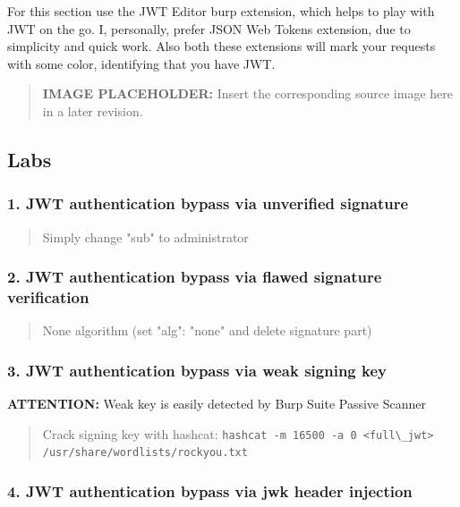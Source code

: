 \documentclass[
  letterpaper,
]{article}
\newcommand{\passthrough}[1]{#1}
\begin{document}
For this section use the JWT Editor burp extension, which helps to play
with JWT on the go. I, personally, prefer JSON Web Tokens extension, due
to simplicity and quick work. Also both these extensions will mark your
requests with some color, identifying that you have JWT.\\
\begin{quote}
\textbf{IMAGE PLACEHOLDER:} Insert the corresponding source image here in a later revision.
\end{quote}
\subsection{Labs}\label{labs-19}

\subsubsection{1. JWT authentication bypass via unverified
signature}\label{1-jwt-authentication-bypass-via-unverified-signature}

\begin{quote}
Simply change "sub" to administrator
\end{quote}

\subsubsection{2. JWT authentication bypass via flawed signature
verification}\label{2-jwt-authentication-bypass-via-flawed-signature-verification}

\begin{quote}
None algorithm (set "alg": "none" and delete signature part)
\end{quote}

\subsubsection{3. JWT authentication bypass via weak signing
key}\label{3-jwt-authentication-bypass-via-weak-signing-key}

\textbf{ATTENTION:} Weak key is easily detected by Burp Suite Passive
Scanner

\begin{quote}
Crack signing key with hashcat:
\passthrough{\lstinline!hashcat -m 16500 -a 0 <full\_jwt> /usr/share/wordlists/rockyou.txt!}
\end{quote}

\subsubsection{4. JWT authentication bypass via jwk header
injection}\label{4-jwt-authentication-bypass-via-jwk-header-injection}
\end{document}
